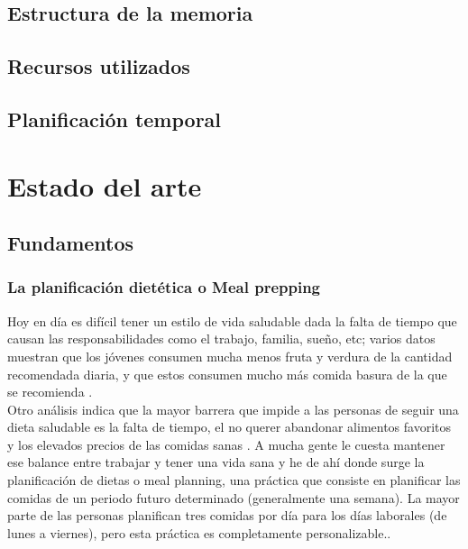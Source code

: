 \documentclass[twoside, openright, 11pt]{report}
\begin{document}
  \section{Estructura de la memoria}
  
  \section{Recursos utilizados}
  
  \section{Planificación temporal}
  

\chapter{Estado del arte}\label{cap.estado del arte}
  \section{Fundamentos}
  
  \subsection*{La planificación dietética o Meal prepping}
  
	  Hoy en día es difícil tener un estilo de vida saludable dada la falta de tiempo que causan las responsabilidades como el trabajo, familia, sueño, etc; varios datos muestran que los jóvenes consumen mucha menos fruta y verdura de la cantidad recomendada diaria, y que estos consumen mucho más comida basura de la que se recomienda \cite{NLMDifficultyEatingHealthy}.
	  \\
	  Otro análisis indica que la mayor barrera que impide a las personas de seguir una dieta saludable es la falta de tiempo, el no querer abandonar alimentos favoritos y los elevados precios de las comidas sanas \cite{NLMDifficultyEatingHealthy}. A mucha gente le cuesta mantener ese balance entre trabajar y tener una vida sana y he de ahí donde surge la planificación de dietas o meal planning, una práctica que consiste en planificar las comidas de un periodo futuro determinado (generalmente una semana). La mayor parte de las personas planifican tres comidas por día para los días laborales (de lunes a viernes), pero esta práctica es completamente personalizable.\cite{HowToMealPrep}.
	  \\
	  \\
	  
\end{document}
